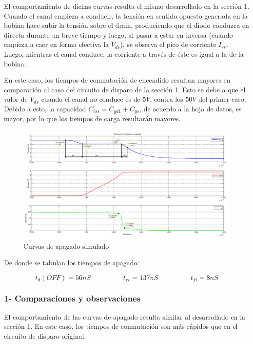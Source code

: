 \documentclass[e4_tp1_main.tex]{subfiles}
\begin{document}
El comportamiento de dichas curvas resulta el mismo desarrollado en la sección 1. Cuando el canal empieza a conducir, la tensión en sentido opuesto generada en la bobina hace subir la tensión sobre el drain, produciendo que el diodo conduzca en directa durante un breve tiempo y luego, al pasar a estar en inversa (cuando empieza a caer en forma efectiva la $V_{ds}$), se observa el pico de corriente $I_{rr}$. Luego, mientras el canal conduce, la corriente a través de éste es igual a la de la bobina.\par
En este caso, los tiempos de conmutación de encendido resultan mayores en comparación al caso del circuito de disparo de la sección 1. Esto se debe a que el valor de $V_{ds}$ cuando el canal no conduce es de $5V$, contra los $50V$ del primer caso. Debido a esto, la capacidad $C_{iss} = C_{gd1} + C_{gs}$, de acuerdo a la hoja de datos, es mayor, por lo que los tiempos de carga resultarán mayores.

\begin{figure}[H]
\centering
\includegraphics[width=1\linewidth]{Imagenes/Punto3/tiempos_apagadoX.png}
\caption{Curvas de apagado simulado}
\end{figure}

De donde se tabulan los tiempos de apagado:

\[
t_d(OFF) = 56nS \hspace{2cm} t_{rv} = 137nS \hspace{2cm} t_{fi} = 8nS 
\]

\subsubsection*{1- Comparaciones y observaciones}

El comportamiento de las curvas de apagado resulta similar al desarrollado en la sección 1. En este caso, los tiempos de conmutación son más rápidos que en el circuito de disparo original.
\par
\end{document}
